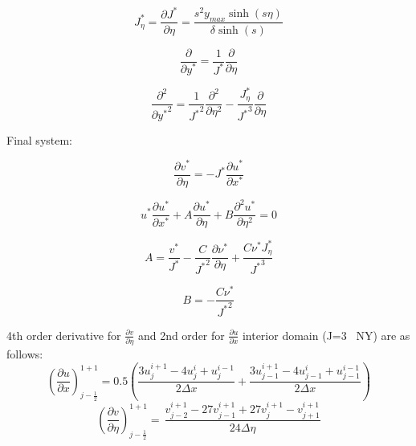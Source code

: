 \documentclass[letterpaper,12pt]{article}
\begin{document}
\begin{equation}
\boxed{
    J_{\eta}^* = \frac{\partial J^*}{\partial \eta} = \frac{s^2 y_{max} \sinh(s \eta)}{\delta \sinh(s)}
}
\end{equation}

\begin{equation}
\boxed{
    \frac{\partial}{\partial y^*} = \frac{1}{J^*} \frac{\partial}{\partial \eta}
}
\end{equation}

\begin{equation}
\boxed{
 \frac{\partial^2}{\partial {y^*}^2} = \frac{1}{{J^*}^2} \frac{\partial^2}{\partial \eta^2} - \frac{J_{\eta}^*}{{J^*}^3} \frac{\partial}{\partial \eta}
}
\end{equation}

Final system:

\begin{equation}
\boxed{
    \frac{\partial v^*}{\partial \eta} = -J^* \frac{\partial u^*}{\partial x^*}
}
\end{equation}

\begin{equation}
\boxed{
    u^* \frac{\partial u^*}{\partial x^*} + A \frac{\partial u^*}{\partial \eta} + B \frac{\partial^2 u^*}{\partial \eta^2} = 0
}
\end{equation}

\begin{equation}
\boxed{
    A = \frac{v^*}{J^*} - \frac{C}{{J^*}^2} \frac{\partial \nu^*}{\partial \eta} + \frac{C \nu^* J_{\eta}^*}{{J^*}^3}
}
\end{equation}

\begin{equation}
\boxed{
    B = - \frac{C \nu^*}{{J^*}^2}
}
\end{equation}


4th order derivative for $\frac{\partial v}{\partial \eta}$ and 2nd order for $\frac{\partial u}{\partial x}$ interior domain (J=3 ~NY) are as follows:
\begin{equation}
    \left( \frac{\partial u}{\partial x} \right)^{1+1}_{j-\frac{1}{2}} = 0.5 \left( \frac{3 u_{j}^{i+1} - 4 u_{j}^{i} + u_{j}^{i-1}}{2 \Delta x} + \frac{3 u_{j-1}^{i+1} - 4 u_{j-1}^{i} + u_{j-1}^{i-1}}{2 \Delta x}  \right)
\end{equation}
\begin{equation}
    \left( \frac{\partial v}{\partial \eta} \right)^{1+1}_{j-\frac{1}{2}} = \frac{}{}\frac{v_{j-2}^{i+1} -27 v_{j-1}^{i+1} + 27 v_{j}^{i+1} - v_{j+1}^{i+1}}{24 \Delta \eta}
\end{equation}
\end{document}
